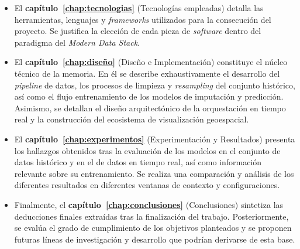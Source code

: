 \begin{itemize}
	\item El \textbf{capítulo~\ref{chap:tecnologias}} (Tecnologías empleadas) detalla las herramientas, lenguajes y \textit{frameworks} utilizados para la consecución del proyecto. Se justifica la elección de cada pieza de \textit{software} dentro del paradigma del \textit{Modern Data Stack}.
	
	\item El \textbf{capítulo~\ref{chap:diseño}} (Diseño e Implementación) constituye el núcleo técnico de la memoria. En él se describe exhaustivamente el desarrollo del \textit{pipeline} de datos, los procesos de limpieza y \textit{resampling} del conjunto histórico, así como el flujo entrenamiento de los modelos de imputación y predicción. Asimismo, se detallan el diseño arquitectónico de la orquestación en tiempo real y la construcción del ecosistema de visualización geoespacial.
	
	\item El \textbf{capítulo~\ref{chap:experimentos}} (Experimentación y Resultados) presenta los hallazgos obtenidos tras la evaluación de los modelos en el conjunto de datos histórico y en el de datos en tiempo real, así como información relevante sobre su entrenamiento. Se realiza una comparación y análisis de los diferentes resultados en diferentes ventanas de contexto y configuraciones.
	
	\item Finalmente, el \textbf{capítulo~\ref{chap:conclusiones}} (Conclusiones) sintetiza las deducciones finales extraídas tras la finalización del trabajo. Posteriormente, se evalúa el grado de cumplimiento de los objetivos planteados y se proponen futuras líneas de investigación y desarrollo que podrían derivarse de esta base.
\end{itemize}